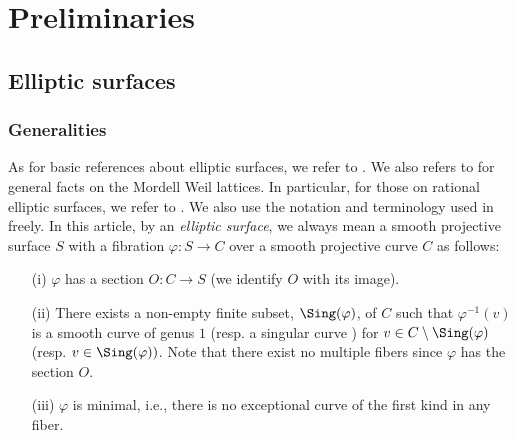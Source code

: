 

\section{Preliminaries}

\subsection{Elliptic surfaces}

\subsubsection{Generalities}

As for basic references about elliptic surfaces, we refer  to \cite{kodaira, miranda-basic}.  We also
refers to \cite{shioda90} for general facts on the Mordell Weil lattices. In particular, 
for those on rational elliptic surfaces, we refer to \cite{oguiso-shioda}.
We also use the notation and terminology used in \cite{bannai-tokunaga, tokunaga14} freely.
In this article, by an {\it elliptic surface}, we always mean a smooth projective surface $S$ 
  with a fibration $\varphi : S \to C$ over a smooth projective curve $C$ as follows:
 \begin{enumerate}
 
  \item[(i)]  $\varphi$ has a section
 $O : C \to S$ (we identify $O$ with its image). 
  \item[(ii)] There exists a non-empty finite subset, $\Sing(\varphi)$, of $C$ such
  that $\varphi^{-1}(v)$ is a smooth curve of genus $1$ (resp. a singular curve ) for $v \in C\setminus \Sing(\varphi)$ (resp. $v \in \Sing(\varphi))$. Note that there exist no multiple fibers since $\varphi$ has the section $O$.

 \item[(iii)]  $\varphi$ is minimal, i.e., there is no exceptional
 curve of the first kind in any fiber. 
 \end{enumerate}
 
